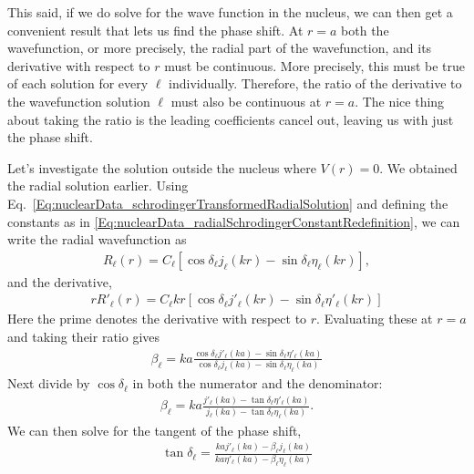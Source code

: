 This said, if we do solve for the wave function in the nucleus, we can then get a convenient result that lets us find the phase shift. At $r = a$ both the wavefunction, or more precisely, the radial part of the wavefunction, and its derivative with respect to $r$ must be continuous. More precisely, this must be true of each solution for every $\ell$ individually. Therefore, the ratio of the derivative to the wavefunction solution $\ell$ must also be continuous at $r = a$. The nice thing about taking the ratio is the leading coefficients cancel out, leaving us with just the phase shift.

Let's investigate the solution outside the nucleus where $V(r) = 0$. We obtained the radial solution earlier. Using Eq.~\eqref{Eq:nuclearData_schrodingerTransformedRadialSolution} and defining the constants as in \eqref{Eq:nuclearData_radialSchrodingerConstantRedefinition}, we can write the radial wavefunction as
\begin{align}
  R_\ell(r) = C_\ell \left[ \cos\delta_\ell j_\ell(kr) - \sin\delta_\ell \eta_\ell(kr) \right] ,
\end{align}
and the derivative,
\begin{align}
  r R'_\ell(r) = C_\ell k r \left[ \cos\delta_\ell j'_\ell(kr) - \sin\delta_\ell \eta'_\ell(kr) \right]
\end{align}
Here the prime denotes the derivative with respect to $r$. Evaluating these at $r = a$ and taking their ratio  gives
\begin{align}
  \beta_\ell = ka \frac{ \cos\delta_\ell j'_\ell(ka) - \sin\delta_\ell \eta'_\ell(ka) }{ \cos\delta_\ell j_\ell(ka) - \sin\delta_\ell \eta_\ell(ka) }
\end{align}
Next divide by $\cos\delta_\ell$ in both the numerator and the denominator:
\begin{align} 
  \beta_\ell = ka \frac{  j'_\ell(ka) - \tan\delta_\ell \eta'_\ell(ka) }{  j_\ell(ka) - \tan\delta_\ell \eta_\ell(ka) } .
\end{align}
We can then solve for the tangent of the phase shift,
\begin{align} \label{Eq:nuclearData_tangentPhaseShift}
  \tan\delta_\ell = \frac{ ka j'_\ell(ka) - \beta_\ell j_\ell(ka) }{ ka \eta'_\ell(ka) - \beta_\ell \eta_\ell(ka) }
\end{align}

